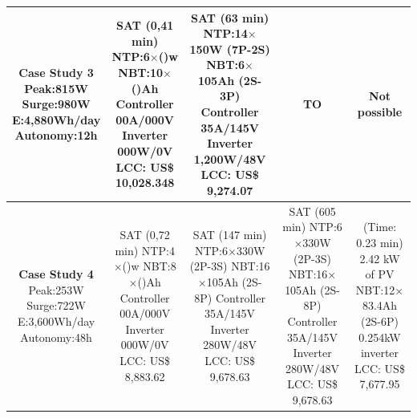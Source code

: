 \documentclass[10pt,journal,compsoc]{IEEEtran}
\begin{document}
\begin{table}
\begin{scriptsize}
\begin{tabular}{c|c|c|c|c}
\hline
\makecell{\textbf{Case Study 3}\\Peak:815W\\Surge:980W\\E:4,880Wh/day\\Autonomy:12h} & \makecell{SAT (0,41 min) \\NTP:6$\times$()w\\NBT:10$\times$()Ah\\Controller 00A/000V\\Inverter 000W/0V\\LCC: US\$ 10,028.348} & 
\makecell{SAT (63 min) \\NTP:14$\times$150W (7P-2S)\\NBT:6$\times$105Ah (2S-3P)\\Controller 35A/145V\\Inverter 1,200W/48V\\LCC: US\$ 9,274.07} & TO & Not possible \\

\hline
\makecell{\textbf{Case Study 4}\\Peak:253W\\Surge:722W\\E:3,600Wh/day\\Autonomy:48h} & 
\makecell{SAT (0,72 min) \\NTP:4$\times$()w\\NBT:8$\times$()Ah\\Controller 00A/000V\\Inverter 000W/0V\\LCC: US\$ 8,883.62} &
\makecell{SAT (147 min) \\NTP:6$\times$330W (2P-3S)\\NBT:16$\times$105Ah (2S-8P)\\Controller 35A/145V\\Inverter 280W/48V\\LCC: US\$ 9,678.63} &
\makecell{SAT (605 min) \\NTP:6$\times$330W (2P-3S)\\NBT:16$\times$105Ah (2S-8P)\\Controller 35A/145V\\Inverter 280W/48V\\LCC: US\$ 9,678.63} &
\makecell{(Time: 0.23 min)\\2.42 kW of PV\\NBT:12$\times$83.4Ah (2S-6P)\\0.254kW inverter\\LCC: US\$ 7,677.95}\\


\end{tabular}
\end{scriptsize}
\end{table}
\end{document}

